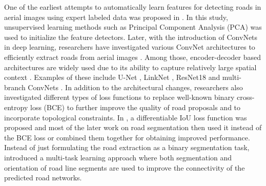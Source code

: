 \documentclass[letterpaper, 10 pt, conference]{ieeeconf}
\begin{document}
 One of the earliest attempts to automatically learn features for detecting roads in aerial images using expert labeled data was proposed in \cite{mnih2010learning}. In this study, unsupervised learning methods such as Principal Component Analysis (PCA) was used to initialize the feature detectors. Later, with the introduction of ConvNets in deep learning, researchers have investigated various ConvNet architectures to efficiently extract roads from aerial images \cite{abdollahi2020deep}. Among those, encoder-decoder based architectures are widely used due to its ability to capture relatively large spatial context \cite{abdollahi2020deep, bastani2018roadtracer}. Examples of these include U-Net \cite{ronneberger2015u}, LinkNet \cite{chaurasia2017linknet}, ResNet18 \cite{he2016deep} and multi-branch ConvNets \cite{batra2019improved, newell2016stacked}. In addition to the architectural changes, researchers also investigated different types of loss functions to replace well-known binary cross-entropy loss (BCE) to further improve the quality of road proposals and to incorporate topological constraints. In \cite{mattyus2017deeproadmapper}, a differentiable IoU loss function was proposed and most of the later work on road segmentation then used it instead of the BCE loss or combined them together for obtaining improved performance. Instead of just formulating the road extraction as a binary segmentation task, \cite{batra2019improved} introduced a multi-task learning \cite{kendall2018multi} approach where both segmentation and orientation of road line segments are used to improve the connectivity of the predicted road networks.\\   
\end{document}
